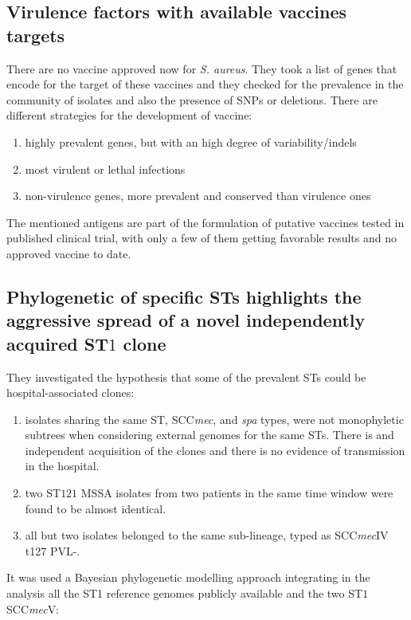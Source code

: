 \subsection{Virulence factors with available vaccines targets}

There are no vaccine approved now for \emph{S. aureus}. They took a list of genes that encode for the target of these vaccines and they checked for the prevalence in the community of isolates and also the presence of SNPs or deletions.
There are different strategies for the development of vaccine: 

\begin{enumerate}
    \item highly prevalent genes, but with an high degree of variability/indels
    \item most virulent or lethal infections
    \item non-virulence genes, more prevalent and conserved than virulence ones
\end{enumerate}

The mentioned antigens are part of the formulation of putative vaccines tested in published clinical trial, with only a few of them getting favorable results and no approved vaccine to date. 

\subsection{Phylogenetic of specific STs highlights the aggressive spread of a novel independently acquired ST$1$ clone}

They investigated the hypothesis that some of the prevalent STs could be hospital-associated clones: 
\begin{enumerate}
    \item isolates sharing the same ST, SCC\emph{mec}, and \emph{spa} types, were not monophyletic subtrees when considering external genomes for the same STs. There is and independent acquisition of the clones and there is no evidence of transmission in the hospital.
    \item two ST$121$ MSSA isolates from two patients in the same time window were found to be almost identical. 
    \item all but two isolates belonged to the same sub-lineage, typed as SCC\emph{mec}IV t127 PVL-.
\end{enumerate}

It was used a Bayesian phylogenetic modelling approach integrating in the analysis all the ST1 reference genomes publicly available and the two ST$1$ SCC\emph{mec}V: 

